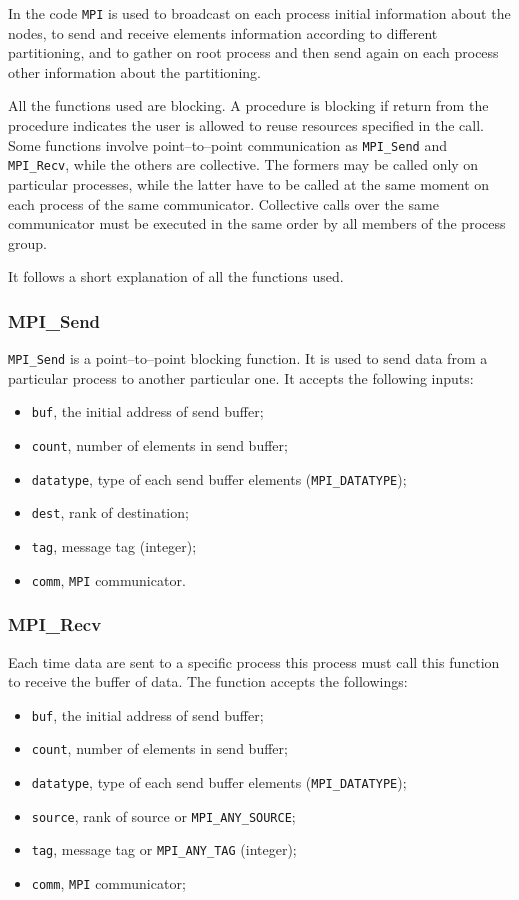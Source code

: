 In the code \verb|MPI| is used to broadcast on each process initial information about the nodes, to send and receive elements information according to different partitioning, and to gather on root process and then send again on each process other information about the partitioning.

All the functions used are blocking. A procedure is blocking if return from the procedure indicates the user is allowed to reuse resources specified in the call. Some functions involve point--to--point communication as  \verb|MPI_Send| and \verb|MPI_Recv|, while the others are collective. The formers may be called only on particular processes, while the latter have to be called at the same moment on each process of the same communicator. Collective calls over the same communicator must be executed in the same order by all members of the process group.

It follows a short explanation of all the functions used.

\subsubsection{MPI\_Send}\label{subsubsection:send}
\verb|MPI_Send| is a point--to--point blocking function. It is used to send data from a particular process to another particular one. It accepts the following inputs:

\begin{itemize}
\item \verb|buf|, the initial address of send buffer;
\item \verb|count|, number of elements in send buffer;
\item \verb|datatype|, type of each send buffer elements (\verb|MPI_DATATYPE|);
\item \verb|dest|, rank of destination;
\item \verb|tag|, message tag (integer);
\item \verb|comm|, \verb|MPI| communicator.
\end{itemize}

\subsubsection{MPI\_Recv}\label{subsubsection:recv}
Each time data are sent to a specific process this process must call this function to receive the buffer of data. The function accepts the followings:

\begin{itemize}
\item \verb|buf|, the initial address of send buffer;
\item \verb|count|, number of elements in send buffer;
\item \verb|datatype|, type of each send buffer elements (\verb|MPI_DATATYPE|);
\item \verb|source|, rank of source or \verb|MPI_ANY_SOURCE|;
\item \verb|tag|, message tag or \verb|MPI_ANY_TAG| (integer);
\item \verb|comm|, \verb|MPI| communicator;
\end{itemize}

